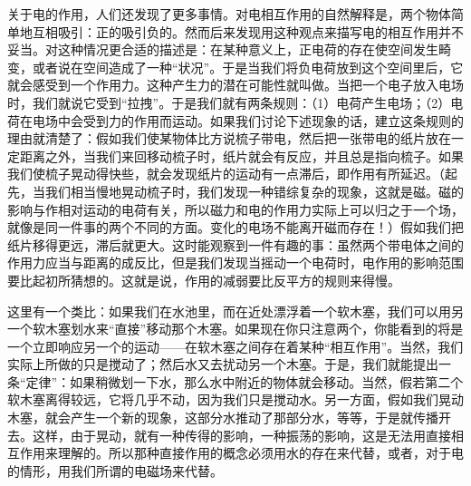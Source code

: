 关于电的作用，人们还发现了更多事情。对电相互作用的自然解释是，两个物体简单地互相吸引：正的吸引负的。然而后来发现用这种观点来描写电的相互作用并不妥当。对这种情况更合适的描述是：在某种意义上，正电荷的存在使空间发生畸变，或者说在空间造成了一种“状况”。于是当我们将负电荷放到这个空间里后，它就会感受到一个作用力。这种产生力的潜在可能性就叫做。当把一个电子放入电场时，我们就说它受到“拉拽”。于是我们就有两条规则：（1）电荷产生电场；（2）电荷在电场中会受到力的作用而运动。如果我们讨论下述现象的话，建立这条规则的理由就清楚了：假如我们使某物体比方说梳子带电，然后把一张带电的纸片放在一定距离之外，当我们来回移动梳子时，纸片就会有反应，并且总是指向梳子。如果我们使梳子晃动得快些，就会发现纸片的运动有一点滞后，即作用有所延迟。（起先，当我们相当慢地晃动梳子时，我们发现一种错综复杂的现象，这就是磁。磁的影响与作相对运动的电荷有关，所以磁力和电的作用力实际上可以归之于一个场，就像是同一件事的两个不同的方面。变化的电场不能离开磁而存在！）假如我们把纸片移得更远，滞后就更大。这时能观察到一件有趣的事：虽然两个带电体之间的作用力应当与距离的成反比，但是我们发现当摇动一个电荷时，电作用的影响范围要比起初所猜想的。这就是说，作用的减弱要比反平方的规则来得慢。

这里有一个类比：如果我们在水池里，而在近处漂浮着一个软木塞，我们可以用另一个软木塞划水来“直接”移动那个木塞。如果现在你只注意两个，你能看到的将是一个立即响应另一个的运动——在软木塞之间存在着某种“相互作用”。当然，我们实际上所做的只是搅动了；然后水又去扰动另一个木塞。于是，我们就能提出一条“定律”：如果稍微划一下水，那么水中附近的物体就会移动。当然，假若第二个软木塞离得较远，它将几乎不动，因为我们只是搅动水。另一方面，假如我们晃动木塞，就会产生一个新的现象，这部分水推动了那部分水，等等，于是就传播开去。这样，由于晃动，就有一种传得的影响，一种振荡的影响，这是无法用直接相互作用来理解的。所以那种直接作用的概念必须用水的存在来代替，或者，对于电的情形，用我们所谓的电磁场来代替。

